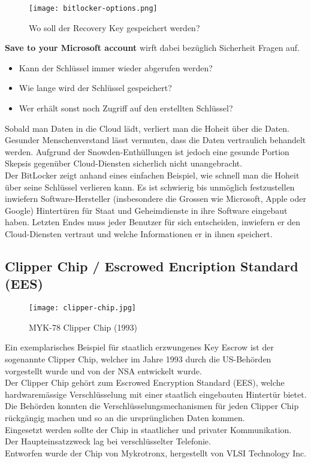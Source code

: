 \begin{figure}[H]
	\centering
	\texttt{[image: bitlocker-options.png]}
	\caption{Wo soll der Recovery Key gespeichert werden?}
	{\cite{bitlocker}}
	\label{fig:clipper-chip}
\end{figure}
\textbf{Save to your Microsoft account} wirft dabei bezüglich Sicherheit Fragen auf.
\begin{itemize}
	\item Kann der Schlüssel immer wieder abgerufen werden?
	\item Wie lange wird der Schlüssel gespeichert?
	\item Wer erhält sonst noch Zugriff auf den erstellten Schlüssel?
\end{itemize}
Sobald man Daten in die Cloud lädt, verliert man die Hoheit über die Daten. Gesunder Menschenverstand lässt vermuten, dass die Daten vertraulich behandelt werden. Aufgrund der Snowden-Enthüllungen ist jedoch eine gesunde Portion Skepsis gegenüber Cloud-Diensten sicherlich nicht unangebracht.\\
Der BitLocker zeigt anhand eines einfachen Beispiel, wie schnell man die Hoheit über seine Schlüssel verlieren kann. Es ist schwierig bis unmöglich festzustellen inwiefern Software-Hersteller (insbesondere die Grossen wie Microsoft, Apple oder Google) Hintertüren für Staat und Geheimdienste in ihre Software eingebaut haben. Letzten Endes muss jeder Benutzer für sich entscheiden, inwiefern er den Cloud-Diensten vertraut und welche Informationen er in ihnen speichert.

	\subsection{Clipper Chip / Escrowed Encription Standard (EES)} \label{ssec:clipperchip}
\begin{figure}[H]
	\centering
	\texttt{[image: clipper-chip.jpg]}
	\caption{MYK-78 Clipper Chip (1993)}
	\label{fig:clipper-chip}
\end{figure}
Ein exemplarisches Beispiel für staatlich erzwungenes Key Escrow ist der sogenannte Clipper Chip, welcher im Jahre 1993 durch die US-Behörden vorgestellt wurde und von der NSA entwickelt wurde.\\
Der Clipper Chip gehört zum Escrowed Encryption Standard (EES), welche hardwaremässige Verschlüsselung mit einer staatlich eingebauten Hintertür bietet. Die Behörden konnten die Verschlüsselungsmechanismen für jeden Clipper Chip rückgängig machen und so an die ursprünglichen Daten kommen. \\
Eingesetzt werden sollte der Chip in staatlicher und privater Kommunikation. Der Haupteinsatzzweck lag bei verschlüsselter Telefonie. \cite{ees}\\
Entworfen wurde der Chip von Mykrotronx, hergestellt von VLSI Technology Inc. \\

